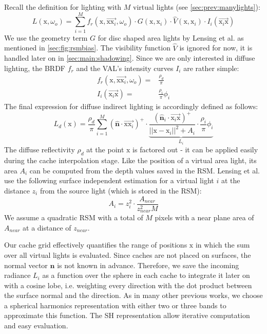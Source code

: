 \documentclass[thesis.tex]{subfiles}
\begin{document}
Recall the definition for lighting with $M$ virtual lights (see \autoref{sec:prev:manylights}):
\begin{equation}
L(\mathrm{x}, \omega_o) = \sum\limits_{i=1}^{M} f_r(\mathrm{x}, \overrightarrow{\mathrm{x}\mathrm{x}_i}, \omega_o) \cdot G(\mathrm{x}, \mathrm{x}_i) \cdot \hat{V}(\mathrm{x}, \mathrm{x}_i) \cdot I_i(\overrightarrow{\mathrm{x}_i\mathrm{x}})
\end{equation}
We use the geometry term $G$ for disc shaped area lights by Lensing et al. \cite{bib:LightskinPaper} as mentioned in \autoref{sec:fig:rsmbias}.
The visibility function $\hat{V}$ is ignored for now, it is handled later on in \autoref{sec:main:shadowing}.
Since we are only interested in diffuse lighting, the BRDF $f_r$ and the VAL's intensity curves $I_i$ are rather simple:
\begin{align}
f_r(\mathrm{x}, \overrightarrow{\mathrm{x}\mathrm{x}_i}, \omega_o) =& \frac{\rho_d}{\pi}\\
I_i(\overrightarrow{\mathrm{x}_i\mathrm{x}}) =& \frac{\rho_i}{\pi} \phi_i
\end{align}
The final expression for diffuse indirect lighting is accordingly defined as follows:
\begin{equation} \label{eq:rsmdiffuse}
L_d (\mathrm{x}) = \frac{\rho_d}{\pi} \sum\limits_{i=1}^{M} 
(\hat{\mathbf{n}} \cdot \overrightarrow{\mathrm{x}\mathrm{x}_i} )^+ \cdot
\underbrace{\frac{(\hat{\mathbf{n}}_i\cdot \overrightarrow{\mathrm{x}_i\mathrm{x}})^+}{||\mathrm{x} - \mathrm{x}_i||^2 + A_i} \cdot  \frac{\rho_i}{\pi} \phi_i}_{L_i}
\end{equation}
The diffuse reflectivity $\rho_d$ at the point $\mathrm{x}$ is factored out - it can be applied easily during the cache interpolation stage.
Like the position of a virtual area light, its area $A_i$ can be computed from the depth values saved in the RSM.
Lensing et al. \cite{bib:LightskinPaper} use the following surface independent estimation for a virtual light $i$ at the distance $z_i$ from the source light (which is stored in the RSM):
\begin{equation}
A_i = z_i^2 \cdot \frac{A_{near}}{z_{near}^2 M}
\end{equation}
We assume a quadratic RSM with a total of $M$ pixels with a near plane area of $A_{near}$ at a distance of $z_{near}$.

Our cache grid effectively quantifies the range of positions $\mathrm{x}$ in which the sum over all virtual lights is evaluated.
Since caches are not placed on surfaces, the normal vector $\hat{\mathbf{n}}$ is not known in advance.
Therefore, we save the incoming radiance $L_i$ as a function over the sphere in each cache to integrate it later on with a cosine lobe, i.e. weighting every direction with the dot product between the surface normal and the direction.
As in many other previous works, we choose a spherical harmonics representation with either two or three bands to approximate this function.
The SH representation allow iterative computation and easy evaluation.
\end{document}
